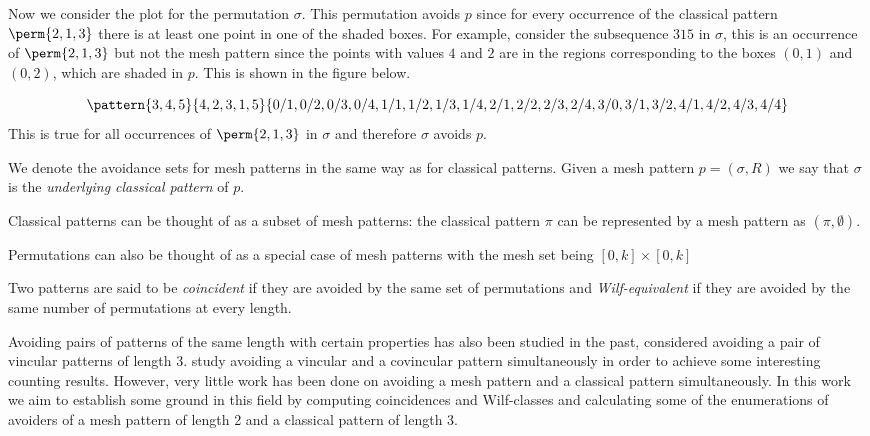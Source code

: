 Now we consider the plot for the permutation \(\sigma\). This permutation
avoids \(p\) since for every occurrence of the classical pattern \(\perm{2,1,3}\)
there is at least one point in one of the shaded boxes. For example, consider the
subsequence \(315\) in \(\sigma\), this is an occurrence of \(\perm{2,1,3}\) but
not the mesh pattern since the points with values \(4\) and \(2\) are in the
regions corresponding to the boxes \((0,1)\) and \((0,2)\), which are shaded in
\(p\). This is shown in the figure below.

\begin{equation*}
    \pattern{3,4,5}{4,2,3,1,5}{0/1,0/2,0/3,0/4,
                               1/1,1/2,1/3,1/4,
                               2/1,2/2,2/3,2/4,
                               3/0,3/1,3/2,
                               4/1,4/2,4/3,4/4}
\end{equation*}
This is true for all occurrences of \(\perm{2,1,3}\) in \(\sigma\) and
therefore \(\sigma\) avoids \(p\).

We denote the avoidance sets for mesh patterns in the same way as for
classical patterns. Given a mesh pattern \(p=(\sigma,R)\) we say that \(\sigma\) is the \emph{underlying
classical pattern} of \(p\).
\begin{note}
    \label{not:classmesh}
    Classical patterns can be thought of as a subset of mesh patterns: the
    classical pattern \(\pi\) can be represented by a mesh pattern as
    \((\pi,\emptyset)\).
\end{note}
\begin{note}
  Permutations can also be thought of as a special case of mesh patterns with
  the mesh set being \([0,k]\times [0,k]\)
\end{note}

Two patterns are said to be \emph{coincident} if they are avoided by the same set of
permutations and \emph{Wilf-equivalent} if they are avoided by the same number of permutations
at every length.

Avoiding pairs of patterns of the same length with certain properties has
also been studied in the past, \textcite{MR2178749} considered avoiding a
pair of vincular patterns of length 3. \textcite{2015arXiv151203226B} study avoiding
a vincular and a covincular pattern simultaneously in order to achieve some
interesting counting results. However, very little work has been done on avoiding
a mesh pattern and a classical pattern simultaneously. In this work we aim to
establish some ground in this field by computing coincidences and Wilf-classes
and calculating some of the enumerations of avoiders of a mesh pattern of length
2 and a classical pattern of length 3.

